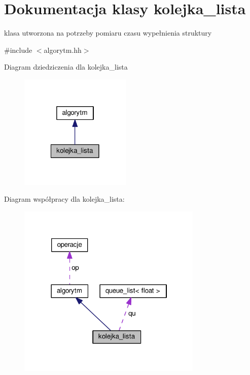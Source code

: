 \hypertarget{classkolejka__lista}{\section{Dokumentacja klasy kolejka\-\_\-lista}
\label{classkolejka__lista}
}


klasa utworzona na potrzeby pomiaru czasu wypełnienia struktury  




{\ttfamily \#include $<$algorytm.\-hh$>$}



Diagram dziedziczenia dla kolejka\-\_\-lista\nopagebreak
\begin{figure}[H]
\begin{center}
\leavevmode
\includegraphics[width=150pt]{classkolejka__lista__inherit__graph}
\end{center}
\end{figure}


Diagram współpracy dla kolejka\-\_\-lista\-:\nopagebreak
\begin{figure}[H]
\begin{center}
\leavevmode
\includegraphics[width=249pt]{classkolejka__lista__coll__graph}
\end{center}
\end{figure}

